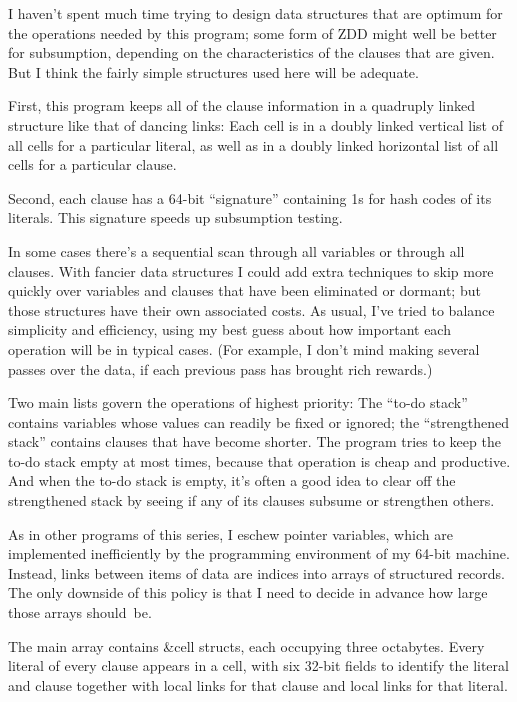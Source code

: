 \fi

I haven't spent much time trying to design data structures
that
are optimum for the operations needed by this program; some form of ZDD
might well be better for subsumption, depending on the characteristics
of the clauses that are given. But I think the
fairly simple structures used here will be adequate.

First, this program keeps all of the clause
information in a quadruply linked structure like that of dancing
links: Each cell is in a doubly linked vertical list of all cells for a
particular literal, as well as in a doubly linked horizontal list of
all cells for a particular clause.

Second, each clause has a 64-bit ``signature'' containing 1s
for hash codes of its literals. This signature speeds up
subsumption testing.

In some cases there's a sequential scan through all variables
or through all clauses. With fancier data structures I could add
extra techniques to skip more quickly over variables and
clauses that have been eliminated or dormant; but those structures
have their own associated costs. As usual, I've tried to balance
simplicity and efficiency, using my best guess about how important
each operation will be in typical cases. (For example, I don't
mind making several passes over the data, if each previous pass
has brought rich rewards.)

Two main lists govern the operations of highest priority: The
``to-do stack'' contains variables whose values can readily be
fixed or ignored; the ``strengthened stack'' contains clauses
that have become shorter. The program tries to keep the to-do stack
empty at most times, because that operation is cheap and productive.
And when the to-do stack is empty, it's often a good idea to
clear off the strengthened stack by seeing if any of its
clauses subsume or strengthen others.

As in other programs of this series, I eschew pointer variables,
which are implemented inefficiently by the programming environment
of my 64-bit machine.
Instead, links between items of data
are indices into arrays of structured records.
The only downside of this policy is that I need to decide
in advance how large those arrays should~be.

\fi

The main  array contains \&{cell} structs, each
occupying three
octabytes. Every literal of every clause appears in a cell, with six
32-bit fields to identify the literal and clause together with local
 links for that clause and local  links for that literal.

